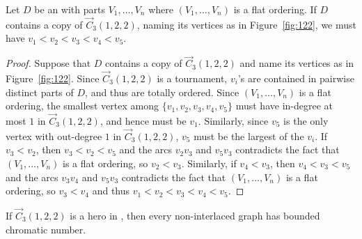 
 

\begin{lemma}\label{lem:flat_interlaced}
Let $D$ be an \omg with parts $V_1, \dots, V_n$ where $(V_1, \dots, V_n)$ is a flat ordering. If $D$ contains a copy of $\vec C_{3}(1, 2, 2)$, naming its vertices as in Figure~\ref{fig:122}, we must have $v_1 < v_2 < v_3 < v_4 < v_5$. 
\end{lemma}

\begin{proof}
    Suppose that $D$ contains a copy of $\vec C_{3}(1, 2, 2)$ and name its vertices as in Figure~\ref{fig:122}. 
    Since $\vec C_{3}(1, 2, 2)$ is a tournament, $v_i$'s are contained in pairwise distinct parts of $D$, and thus are totally ordered. 
    Since $(V_1, \dots, V_n)$ is a flat ordering, the smallest vertex among $\{v_1, v_2, v_3, v_4, v_5\}$ must have in-degree at most $1$ in $\vec C_{3}(1,2,2)$, and hence must be $v_1$. 
    Similarly, since $v_5$ is the only vertex with out-degree $1$ in $\vec C_{3}(1, 2, 2)$, $v_5$ must be the largest of the $v_i$.  
    If $v_3 < v_2$, then $v_3 < v_2 < v_5$ and the arcs $v_2v_3$ and $v_5v_3$ contradicts the fact that $(V_1, \dots, V_n)$ is a flat ordering, so $v_2 < v_3$. Similarly, if $v_4 < v_3$, then $v_4 < v_3 < v_5$ and the arcs $v_3v_4$ and $v_5v_3$ contradicts the fact that $(V_1, \dots, V_n)$ is a flat ordering, so  $v_3 < v_4$ and thus  $v_1 < v_2 < v_3 < v_4 < v_5$. 
\end{proof}

\begin{theorem}\label{thm:interlaced_hero}
If $\vec C_{3}(1, 2, 2)$ is a hero in \omgs, then every non-interlaced graph has bounded chromatic number.
\end{theorem}

